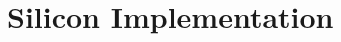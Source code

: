 \documentclass[../main.tex]{subfiles}
\begin{document}
\chapter{Silicon Implementation}
\end{document}
